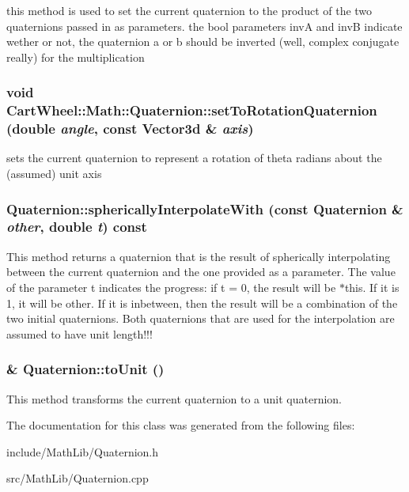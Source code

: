 \label{classCartWheel_1_1Math_1_1Quaternion_a16760d63cc452ac36d9bdb200a1d8374}
this method is used to set the current quaternion to the product of the two quaternions passed in as parameters. the bool parameters invA and invB indicate wether or not, the quaternion a or b should be inverted (well, complex conjugate really) for the multiplication \hypertarget{classCartWheel_1_1Math_1_1Quaternion_afa92e61960b97934e37311e0f00a4822}{
\subsubsection[{setToRotationQuaternion}]{\setlength{\rightskip}{0pt plus 5cm}void CartWheel::Math::Quaternion::setToRotationQuaternion (double {\em angle}, \/  const {\bf Vector3d} \& {\em axis})}}
\label{classCartWheel_1_1Math_1_1Quaternion_afa92e61960b97934e37311e0f00a4822}
sets the current quaternion to represent a rotation of theta radians about the (assumed) unit axis \hypertarget{classCartWheel_1_1Math_1_1Quaternion_a59da7a7cd17477980d227590837ceaba}{
\subsubsection[{sphericallyInterpolateWith}]{ Quaternion::sphericallyInterpolateWith (const {\bf Quaternion} \& {\em other}, \/  double {\em t}) const}}
\label{classCartWheel_1_1Math_1_1Quaternion_a59da7a7cd17477980d227590837ceaba}
This method returns a quaternion that is the result of spherically interpolating between the current quaternion and the one provided as a parameter. The value of the parameter t indicates the progress: if t = 0, the result will be $\ast$this. If it is 1, it will be other. If it is inbetween, then the result will be a combination of the two initial quaternions. Both quaternions that are used for the interpolation are assumed to have unit length!!! \hypertarget{classCartWheel_1_1Math_1_1Quaternion_adc58210f642a0b83b72cad062b9beb0e}{
\subsubsection[{toUnit}]{ \& Quaternion::toUnit ()}}
\label{classCartWheel_1_1Math_1_1Quaternion_adc58210f642a0b83b72cad062b9beb0e}
This method transforms the current quaternion to a unit quaternion. 

The documentation for this class was generated from the following files:\begin{DoxyCompactItemize}
\item 
include/MathLib/Quaternion.h\item 
src/MathLib/Quaternion.cpp\end{DoxyCompactItemize}
